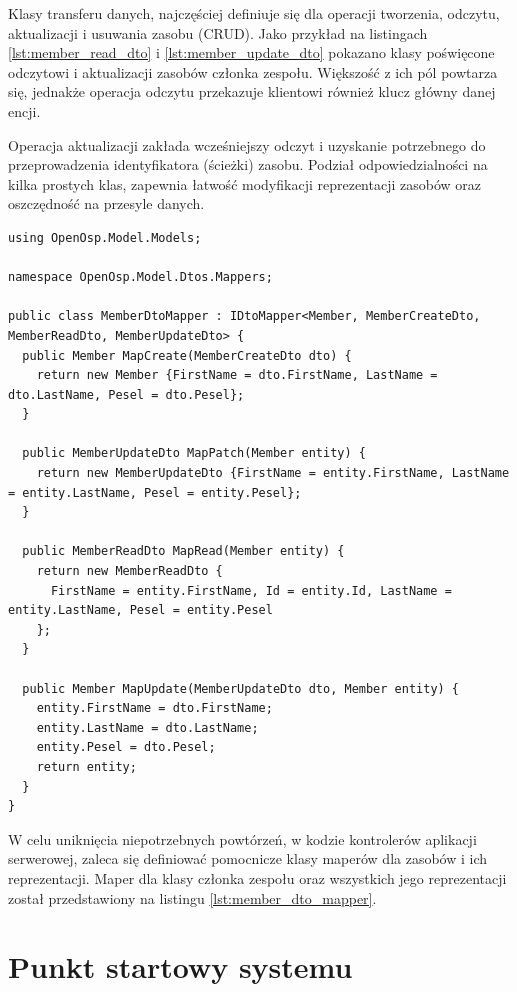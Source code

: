 Klasy transferu danych, najczęściej definiuje się dla operacji tworzenia, odczytu, aktualizacji i usuwania zasobu (CRUD). Jako przykład na listingach \ref{lst:member_read_dto} i \ref{lst:member_update_dto} pokazano klasy poświęcone odczytowi i aktualizacji zasobów członka zespołu. Większość z ich pól powtarza się, jednakże operacja odczytu przekazuje klientowi również klucz główny danej encji. 

Operacja aktualizacji zakłada wcześniejszy odczyt i uzyskanie potrzebnego do przeprowadzenia identyfikatora (ścieżki) zasobu. Podział odpowiedzialności na kilka prostych klas, zapewnia łatwość modyfikacji reprezentacji zasobów oraz oszczędność na przesyle danych.

\begin{lstlisting}[language=CSharp, caption=Przykładowa klasa mapera klas zasobów na klasy jego reprezentacji i na odwrót, label=lst:member_dto_mapper]
using OpenOsp.Model.Models;

namespace OpenOsp.Model.Dtos.Mappers; 

public class MemberDtoMapper : IDtoMapper<Member, MemberCreateDto, MemberReadDto, MemberUpdateDto> {
  public Member MapCreate(MemberCreateDto dto) {
    return new Member {FirstName = dto.FirstName, LastName = dto.LastName, Pesel = dto.Pesel};
  }

  public MemberUpdateDto MapPatch(Member entity) {
    return new MemberUpdateDto {FirstName = entity.FirstName, LastName = entity.LastName, Pesel = entity.Pesel};
  }

  public MemberReadDto MapRead(Member entity) {
    return new MemberReadDto {
      FirstName = entity.FirstName, Id = entity.Id, LastName = entity.LastName, Pesel = entity.Pesel
    };
  }

  public Member MapUpdate(MemberUpdateDto dto, Member entity) {
    entity.FirstName = dto.FirstName;
    entity.LastName = dto.LastName;
    entity.Pesel = dto.Pesel;
    return entity;
  }
}
\end{lstlisting}

W celu uniknięcia niepotrzebnych powtórzeń, w kodzie kontrolerów aplikacji serwerowej, zaleca się definiować pomocnicze klasy maperów dla zasobów i ich reprezentacji. Maper dla klasy członka zespołu oraz wszystkich jego reprezentacji został przedstawiony na listingu \ref{lst:member_dto_mapper}.

\section{Punkt startowy systemu}

